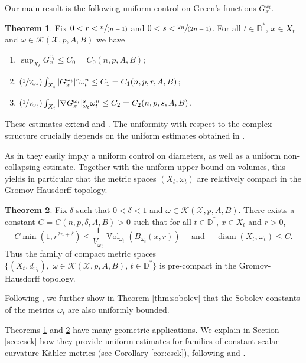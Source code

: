 \documentclass[JEP,XML,SOM,Unicode,published]{cedram}
\newcommand{\Psfrac}[2]{(\sfrac{#1}{#2})}
\newcommand{\spfrac}[2]{\sfrac{#1}{(#2)}}
\DeclareMathOperator{\diam}{diam}
\DeclareMathOperator{\Vol}{Vol}
\theoremstyle{definition}
\newtheorem{thmA}{Theorem}
\newcommand{\D}{\mathbb D}
\begin{document}
Our main result is the following uniform control on Green's functions $G_x^{\omega_t}$.

\begin{thmA}\label{thm_A}
Fix $0<r<\spfrac{n}{n-1}$ and $0<s< \spfrac{2n}{2n-1}$.
For all $t \in \D^*$, $x \in X_t$ and $\omega \in {\mathcal K}(\mathcal{X},p,A,B)$ we have
\begin{enumerate}
\item $\sup_{X_t} G_x^{\omega_t} \leq C_0=C_0(n,p,A,B)$;

\item $\Psfrac{1}{V_{\omega_t}} \int_{X_t} |G_x^{\omega_t}|^r \omega_t^n \leq C_1=C_1(n,p,r,A,B)$;

\item $\Psfrac{1}{V_{\omega_t}} \int_{X_t} |\nabla G_x^{\omega_t}|_{\omega_t}^s \omega_t^n \leq C_2=C_2(n,p,s,A,B)$.
\end{enumerate}
\end{thmA}

These estimates extend \cite[Th.\,1 \& Th.\,2]{GPS22} and \cite[Th.\,1.1]{GPSS22}.
The uniformity with respect to the complex structure crucially depends on the uniform estimates
obtained in \cite{DnGG23}.

As in \cite{GPSS22} they easily imply a uniform control on diameters, as well
as a uniform non-collapsing estimate. Together with the uniform upper bound on volumes, this yields
in particular that the metric spaces $(X_t,\omega_t)$ are relatively compact in the Gromov-Hausdorff topology.

\begin{thmA}\label{thm_B}
Fix $\delta$ such that $0<\delta<1$ and $\omega \in {\mathcal K}(\mathcal{X},p,A,B)$.
There exists a constant $C=C(n,p,\delta,A,B)>0$ such that for all $ t\in \D^*$, $x \in X_t$ and $r>0$,\vspace*{-3pt}
\[
C \min(1,r^{2n+\delta}) \leq \frac{1}{V_{\omega_t}} \Vol_{\omega_t}(B_{\omega_t}(x,r))
\quad \text{ and } \quad
\diam(X_t,\omega_t) \leq C.
\]
Thus the family of compact metric spaces
$\{ (X_t,d_{\omega_t}), \; \omega \in {\mathcal K}(\mathcal{X},p,A,B), \, t \in \D^* \}$
is pre-compact in the Gromov-Hausdorff topology.
\end{thmA}

Following \cite{GPSS23}, we further show in Theorem \ref{thm:sobolev}
that the Sobolev constants of the metrics $\omega_t$ are also uniformly bounded.

Theorems \ref{thm_A} and \ref{thm_B} have many geometric applications. We
explain in Section \ref{sec:csck} how they provide uniform estimates
for families of constant scalar curvature Kähler metrics (see Corollary \ref{cor:csck}), following
\cite{CC21} and \cite{PTT23}.
\end{document}
